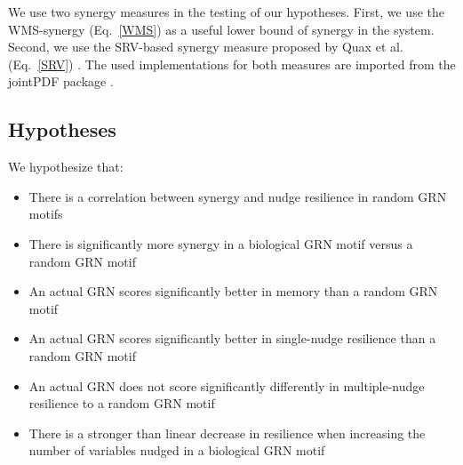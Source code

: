 \documentclass[../main.tex]{subfiles}
\begin{document}
We use two synergy measures in the testing of our hypotheses.
First, we use the WMS-synergy (Eq.~\ref{WMS}) as a useful lower bound of synergy in the system.
Second, we use the SRV-based synergy measure proposed by Quax et al. (Eq.~\ref{SRV}) \cite{quax2017quantifying}.
The used implementations for both measures are imported from the jointPDF package \cite{jointpdf}.

\subsection{Hypotheses}

We hypothesize that:

\begin{itemize}
\item There is a correlation between synergy and nudge resilience in random GRN motifs
\item There is significantly more synergy in a biological GRN motif versus a random GRN motif
\item An actual GRN scores significantly better in memory than a random GRN motif
\item An actual GRN scores significantly better in single-nudge resilience than a random GRN motif
\item An actual GRN does not score significantly differently in multiple-nudge resilience to a random GRN motif
\item There is a stronger than linear decrease in resilience when increasing the number of variables nudged in a biological GRN motif
\end{itemize}


\end{document}
